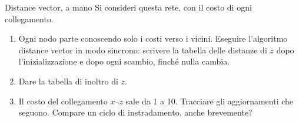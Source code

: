 \begin{esercizio}{Distance vector, a mano}
Si consideri questa rete, con il costo di ogni collegamento.
\begin{center}
\end{center}
\begin{enumerate}[label=(\alph*)]
    \item Ogni nodo parte conoscendo solo i costi verso i vicini. Eseguire l'algoritmo distance vector in modo sincrono: scrivere la tabella
          delle distanze di $z$ dopo l'inizializzazione e dopo ogni scambio, finché nulla cambia.
    \item Dare la tabella di inoltro di $z$.
    \item Il costo del collegamento $x$--$z$ sale da 1 a 10. Tracciare gli aggiornamenti che seguono. Compare un ciclo di instradamento,
          anche brevemente?
\end{enumerate}


\end{esercizio}
